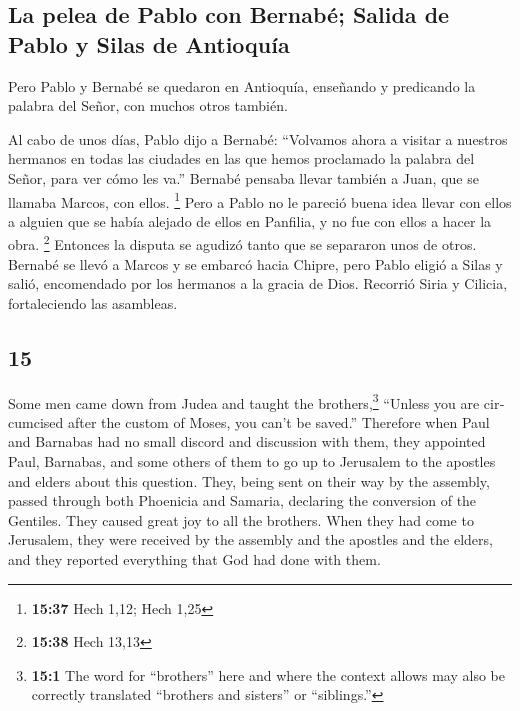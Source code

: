 \begin{paracol}{2}
\hypertarget{la-pelea-de-pablo-con-bernabuxe9-salida-de-pablo-y-silas-de-antioquuxeda}{%
\subsection{La pelea de Pablo con Bernabé; Salida de Pablo y Silas de
Antioquía}\label{la-pelea-de-pablo-con-bernabuxe9-salida-de-pablo-y-silas-de-antioquuxeda}}

 Pero Pablo y Bernabé se quedaron en Antioquía, enseñando
y predicando la palabra del Señor, con muchos otros también.

 Al cabo de unos días, Pablo dijo a Bernabé: ``Volvamos
ahora a visitar a nuestros hermanos en todas las ciudades en las que
hemos proclamado la palabra del Señor, para ver cómo les va.''
 Bernabé pensaba llevar también a Juan, que se llamaba
Marcos, con ellos. \footnote{\textbf{15:37} Hech 1,12; Hech 1,25}
 Pero a Pablo no le pareció buena idea llevar con ellos a
alguien que se había alejado de ellos en Panfilia, y no fue con ellos a
hacer la obra. \footnote{\textbf{15:38} Hech 13,13} 
Entonces la disputa se agudizó tanto que se separaron unos de otros.
Bernabé se llevó a Marcos y se embarcó hacia Chipre, 
pero Pablo eligió a Silas y salió, encomendado por los hermanos a la
gracia de Dios.  Recorrió Siria y Cilicia, fortaleciendo
las asambleas.

\switchcolumn
\begin{otherlanguage}{english}

\hypertarget{section-29}{%
\section{15}\label{section-29}}

 Some men came down from Judea and taught the
brothers,\footnote{\textbf{15:1} The word for ``brothers'' here and
  where the context allows may also be correctly translated ``brothers
  and sisters'' or ``siblings.''} ``Unless you are circumcised after the
custom of Moses, you can't be saved.''  Therefore when
Paul and Barnabas had no small discord and discussion with them, they
appointed Paul, Barnabas, and some others of them to go up to Jerusalem
to the apostles and elders about this question.  They,
being sent on their way by the assembly, passed through both Phoenicia
and Samaria, declaring the conversion of the Gentiles. They caused great
joy to all the brothers.  When they had come to Jerusalem,
they were received by the assembly and the apostles and the elders, and
they reported everything that God had done with them.


\end{otherlanguage}
\end{paracol}
